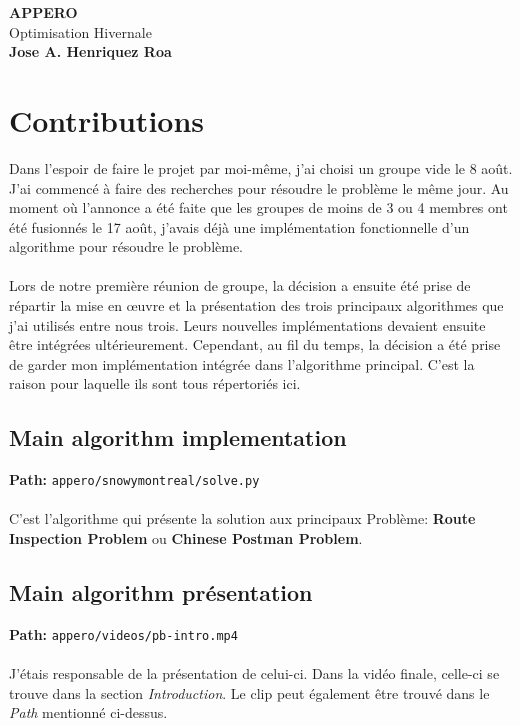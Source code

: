 \documentclass[11pt]{article}
\begin{document}
\begin{titlepage}
  \begin{center}
    \vspace*{1cm}
    \Huge
    \textbf{APPERO}\\
    \vspace{0.4cm}
    Optimisation Hivernale\\
    \vspace{5cm}
    \textbf{Jose A. Henriquez Roa}
    \newpage
    \normalsize
    \tableofcontents
    \newpage
  \end{center}
\end{titlepage}

\section{Contributions}
Dans l'espoir de faire le projet par moi-même, j'ai choisi un groupe vide le 8
août. J'ai commencé à faire des recherches pour résoudre le problème le même
jour. Au moment où l'annonce a été faite que les groupes de moins de 3 ou 4
membres ont été fusionnés le 17 août, j'avais déjà une implémentation
fonctionnelle d'un algorithme pour résoudre le problème.\\\\
Lors de notre première réunion de groupe, la décision a ensuite été prise de
répartir la mise en œuvre et la présentation des trois principaux algorithmes
que j'ai utilisés entre nous trois. Leurs nouvelles implémentations devaient
ensuite être intégrées ultérieurement. Cependant, au fil du temps, la décision a
été prise de garder mon implémentation intégrée dans l'algorithme
principal. C'est la raison pour laquelle ils sont tous répertoriés ici.
\subsection{Main algorithm implementation}
\textbf{Path:} \texttt{appero/snowymontreal/solve.py}\\\\
C'est l'algorithme qui présente la solution aux principaux
Problème: \textbf{Route Inspection Problem} ou \textbf{Chinese Postman Problem}.
\subsection{Main algorithm présentation}
\textbf{Path:} \texttt{appero/videos/pb-intro.mp4}\\\\
J'étais responsable de la présentation de celui-ci. Dans la vidéo finale,
celle-ci se trouve dans la section \textit{Introduction}. Le clip peut également
être trouvé dans le \textit{Path} mentionné ci-dessus.
\end{document}

